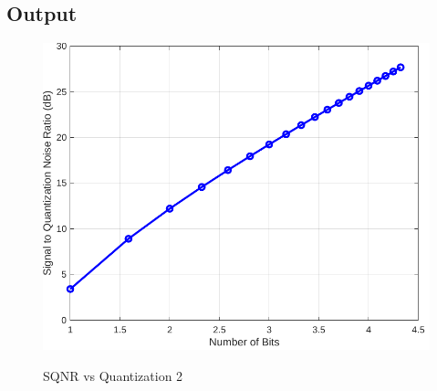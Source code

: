 \inputminted[fontsize=\footnotesize,autogobble]{matlab}{code/sqnr2.m}
\subsection{Output}

\begin{figure}[!htb]
	\centering
	\includegraphics[width=5in]{res/figures/Figure_4.pdf}
	\label{output:SQNR vs quantization 2}
	\caption{SQNR vs Quantization 2}\end{figure}